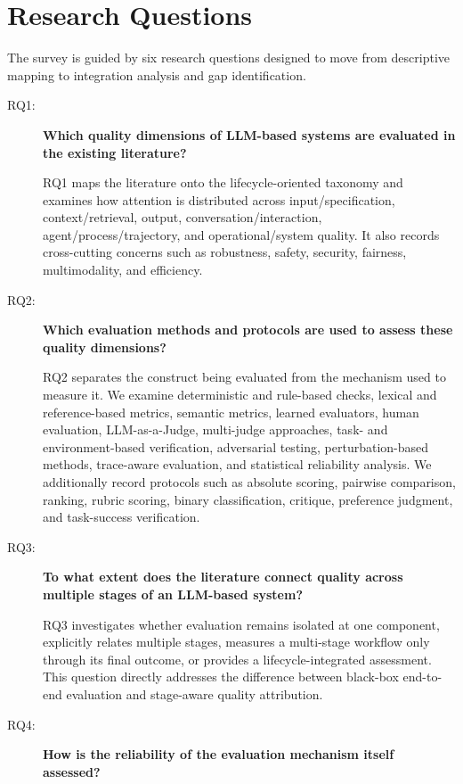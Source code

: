 \section{Research Questions}
\label{sec:research-questions}

The survey is guided by six research questions designed to move from descriptive mapping to integration analysis and gap identification.

\begin{description}

\item[RQ1:] \textbf{Which quality dimensions of LLM-based systems are evaluated in the existing literature?}

RQ1 maps the literature onto the lifecycle-oriented taxonomy and examines how attention is distributed across input/specification, context/retrieval, output, conversation/interaction, agent/process/trajectory, and operational/system quality. It also records cross-cutting concerns such as robustness, safety, security, fairness, multimodality, and efficiency.

\item[RQ2:] \textbf{Which evaluation methods and protocols are used to assess these quality dimensions?}

RQ2 separates the construct being evaluated from the mechanism used to measure it. We examine deterministic and rule-based checks, lexical and reference-based metrics, semantic metrics, learned evaluators, human evaluation, LLM-as-a-Judge, multi-judge approaches, task- and environment-based verification, adversarial testing, perturbation-based methods, trace-aware evaluation, and statistical reliability analysis. We additionally record protocols such as absolute scoring, pairwise comparison, ranking, rubric scoring, binary classification, critique, preference judgment, and task-success verification.

\item[RQ3:] \textbf{To what extent does the literature connect quality across multiple stages of an LLM-based system?}

RQ3 investigates whether evaluation remains isolated at one component, explicitly relates multiple stages, measures a multi-stage workflow only through its final outcome, or provides a lifecycle-integrated assessment. This question directly addresses the difference between black-box end-to-end evaluation and stage-aware quality attribution.

\item[RQ4:] \textbf{How is the reliability of the evaluation mechanism itself assessed?}


\end{description}

